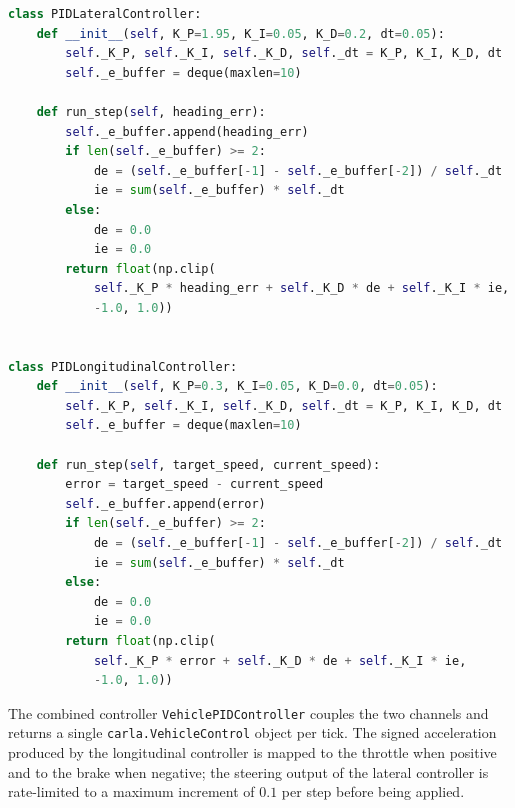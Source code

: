 \begin{lstlisting}[language=Python]
class PIDLateralController:
    def __init__(self, K_P=1.95, K_I=0.05, K_D=0.2, dt=0.05):
        self._K_P, self._K_I, self._K_D, self._dt = K_P, K_I, K_D, dt
        self._e_buffer = deque(maxlen=10)

    def run_step(self, heading_err):
        self._e_buffer.append(heading_err)
        if len(self._e_buffer) >= 2:
            de = (self._e_buffer[-1] - self._e_buffer[-2]) / self._dt
            ie = sum(self._e_buffer) * self._dt
        else:
            de = 0.0
            ie = 0.0
        return float(np.clip(
            self._K_P * heading_err + self._K_D * de + self._K_I * ie,
            -1.0, 1.0))


class PIDLongitudinalController:
    def __init__(self, K_P=0.3, K_I=0.05, K_D=0.0, dt=0.05):
        self._K_P, self._K_I, self._K_D, self._dt = K_P, K_I, K_D, dt
        self._e_buffer = deque(maxlen=10)

    def run_step(self, target_speed, current_speed):
        error = target_speed - current_speed
        self._e_buffer.append(error)
        if len(self._e_buffer) >= 2:
            de = (self._e_buffer[-1] - self._e_buffer[-2]) / self._dt
            ie = sum(self._e_buffer) * self._dt
        else:
            de = 0.0
            ie = 0.0
        return float(np.clip(
            self._K_P * error + self._K_D * de + self._K_I * ie,
            -1.0, 1.0))
\end{lstlisting}

The combined controller \texttt{VehiclePIDController} couples the two channels and returns a single \texttt{carla.VehicleControl} object per tick. The signed acceleration produced by the longitudinal controller is mapped to the throttle when positive and to the brake when negative; the steering output of the lateral controller is rate-limited to a maximum increment of $0.1$ per step before being applied.

